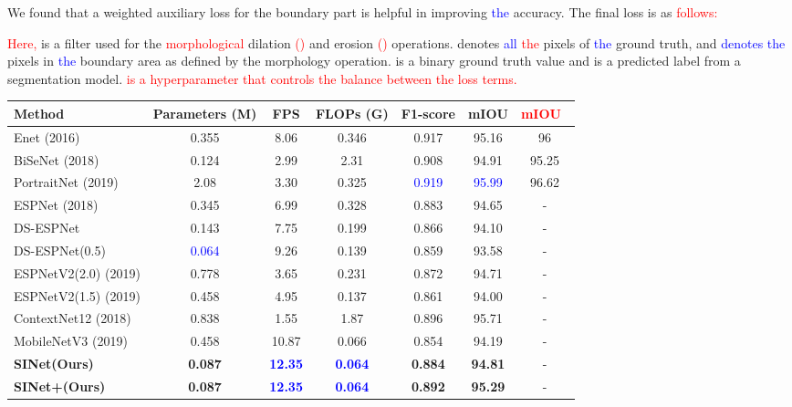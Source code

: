 \documentclass[10pt,twocolumn,letterpaper]{article}
\newcommand\Lars[1]{\textcolor{blue}{#1}}
\newcommand\nj[1]{\textcolor{red}{#1}}
\newcommand\Lars[1]{#1}
\newcommand\nj[1]{#1}
\begin{document}
We found that a weighted auxiliary loss for the boundary part is helpful in improving \Lars{the} accuracy.
The final loss is as \nj{follows:}

\nj{Here,}  is a  filter used for the \nj{morphological} dilation \nj{()} and erosion \nj{()} operations.
 denotes \Lars{all} \nj{the} pixels of \Lars{the} ground truth, and  \Lars{denotes the} pixels in \Lars{the} boundary area as defined by the morphology operation. 
 is a binary ground truth value and  is a predicted label from a segmentation model. \nj{ is a hyperparameter that controls the balance between the loss terms.}


\begin{table*}[t]
\small
  \begin{center}
\begin{tabular*}{0.99\textwidth}{@{\extracolsep{\fill}}| l |  cccccc|}
\hline
    Method & Parameters (M) & FPS & FLOPs (G)   & F1-score& mIOU  & \nj{mIOU}~\cite{zhang2019portraitnet} \\
    \hline
    \hline
    Enet (2016) \cite{paszke2016enet} & 0.355 & 8.06     & 0.346 &    0.917   & 95.16 & 96 \\
    BiSeNet (2018) \cite{yu2018bisenet} & 0.124 &  2.99     & 2.31  &  0.908   & 94.91 & 95.25 \\
    PortraitNet (2019)\cite{zhang2019portraitnet} & 2.08 & 3.30      & 0.325 & \textcolor{blue}{ 0.919 }    & \textcolor{blue}{95.99} & 96.62 \\
    ESPNet (2018)\cite{mehta2018espnet} & 0.345 &  6.99     & 0.328 &   0.883    & 94.65 & - \\
    DS-ESPNet  & 0.143  &    7.75      & 0.199 & 0.866    & 94.10  & - \\
    DS-ESPNet(0.5)  & \textcolor{blue}{0.064} &  9.26     & 0.139 &  0.859     & 93.58 & - \\
    ESPNetV2(2.0) (2019)\cite{mehta2018espnetv2}  & 0.778 &  3.65     & 0.231 &   0.872    & 94.71  & - \\
     ESPNetV2(1.5) (2019)\cite{mehta2018espnetv2} & 0.458  &   4.95    & 0.137 &    0.861   & 94.00 & - \\
    ContextNet12 (2018)\cite{poudel2018contextnet} & 0.838  &  1.55     & 1.87  &   0.896    & 95.71 & - \\

    MobileNetV3 (2019)\cite{howard2019searching} &   0.458     & 10.87      & 0.066 &  0.854     & 94.19  & - \\
    \textbf{SINet(Ours)}  & \textbf{0.087}  &   \textcolor{blue}{\textbf{12.35 }}   & \textcolor{blue}{\textbf{0.064}} &  \textbf{0.884 }    & \textbf{94.81}  & - \\
    \textbf{SINet+(Ours)}  & \textbf{0.087} &  \textcolor{blue}{ \textbf{12.35  }}  &\textcolor{blue}{ \textbf{0.064}} &  \textbf{0.892 }    & \textbf{95.29}  &  -\\
    

\end{tabular*}
\end{center}
\end{table*}
\end{document}

